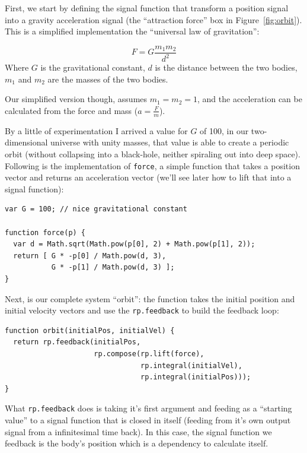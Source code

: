 \documentclass[notitlepage]{article}
\begin{document}
First, we start by defining the signal function that transform a position
signal into a gravity acceleration signal (the ``attraction force'' box in
Figure~\ref{fig:orbit}). This is a simplified implementation the ``universal
law of gravitation'':

\begin{equation}
    F = G \frac{m_1 m_2}{d^2}
\end{equation}
%
Where $G$ is the gravitational constant, $d$ is the distance between the two
bodies, $m_1$ and $m_2$ are the masses of the two bodies.

Our simplified version though, assumes $m_1 = m_2 = 1$, and the acceleration
can be calculated from the force and mass ($a = \frac{F}{m}$).

By a little of experimentation I arrived a value for $G$ of 100, in our
two-dimensional universe with unity masses, that value is able to create a
periodic orbit (without collapsing into a black-hole, neither spiraling out
into deep space). Following is the implementation of \texttt{force}, a simple
function that takes a position vector and returns an acceleration vector (we'll
see later how to lift that into a signal function):

\begin{lstlisting}
var G = 100; // nice gravitational constant

function force(p) {
  var d = Math.sqrt(Math.pow(p[0], 2) + Math.pow(p[1], 2));
  return [ G * -p[0] / Math.pow(d, 3),
           G * -p[1] / Math.pow(d, 3) ];
}
\end{lstlisting}

Next, is our complete system ``orbit'': the function takes the initial position
and initial velocity vectors and use the \texttt{rp.feedback} to build the
feedback loop:

\begin{lstlisting}
function orbit(initialPos, initialVel) {
  return rp.feedback(initialPos,
                     rp.compose(rp.lift(force),
                                rp.integral(initialVel),
                                rp.integral(initialPos)));
}
\end{lstlisting}

What \texttt{rp.feedback} does is taking it's first argument and feeding as a
``starting value'' to a signal function that is closed in itself (feeding from
it's own output signal from a infinitesimal time back). In this case, the
signal function we feedback is the body's position \- which is a dependency to
calculate itself.
\end{document}
